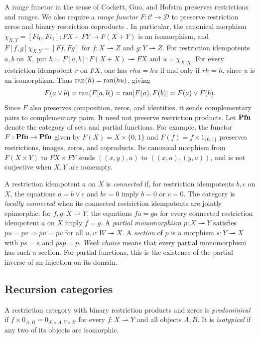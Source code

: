 A range functor in the sense of Cockett, Guo, and Hofstra
\cite[p.~424]{CGHRangeI} preserves restrictions and ranges.
We also require a \emph{range functor}
$F:\mathcal C\to\mathcal D$ to preserve
restriction zeros and binary restriction coproducts \cite[p.~7]{Lengyel2006}.
In particular, the canonical morphism
$\chi_{X,Y}=[F i_0,F i_1]:FX+FY\to F(X+Y)$
is an isomorphism, and
$F[f,g]\chi_{X,Y}=[Ff,Fg]$ for $f:X\rightharpoonup Z$ and
$g:Y\rightharpoonup Z$. For restriction idempotents $a,b$ on $X$, put
$h=F[a,b]:F(X+X)\rightharpoonup FX$ and $u=\chi_{X,X}$.
For every restriction idempotent $r$ on $FX$, one has
$rhu=hu$ if and only if $rh=h$, since $u$ is an isomorphism.
Thus $\operatorname{ran}(h)=\operatorname{ran}(hu)$, giving
\[
 F(a\vee b)=\operatorname{ran}(F[a,b])=\operatorname{ran}[F(a),F(b)]=F(a)\vee F(b).
\]
Since $F$ also preserves composition, zeros, and identities, it sends
complementary pairs to complementary pairs.
It need not preserve restriction products. Let $\mathbf{Pfn}$ denote the
category of sets and partial functions. For example, the functor
$F:\mathbf{Pfn}\to\mathbf{Pfn}$ given by $F(X)=X\times\{0,1\}$ and
$F(f)=f\times1_{\{0,1\}}$ preserves restrictions, images, zeros,
and coproducts. Its canonical morphism from $F(X\times Y)$ to
$FX\times FY$ sends $((x,y),a)$ to $((x,a),(y,a))$, and is
not surjective when $X,Y$ are nonempty.

A restriction idempotent $a$ on $X$ is \emph{connected} if, for
restriction idempotents $b,c$ on $X$, the equations $a=b\vee c$ and
$bc=0$ imply $b=0$ or $c=0$. The category is \emph{locally connected}
when its connected restriction idempotents are jointly epimorphic: for
$f,g:X\rightharpoonup Y$, the equations $fa=ga$ for every connected
restriction idempotent $a$ on $X$ imply $f=g$.
A \emph{partial monomorphism} $p:X\rightharpoonup Y$ satisfies
$pu=pv\Rightarrow\bar p u=\bar p v$ for all
$u,v:W\rightharpoonup X$.
A \emph{section} of $p$ is a morphism $s:Y\rightharpoonup X$
with $ps=\bar s$ and $psp=p$.
\emph{Weak choice} means that every partial monomorphism has such
a section. For partial functions, this is the existence of the
partial inverse of an injection on its domain.

\subsection{Recursion categories}

A restriction category with binary restriction products and zeros is
\emph{prodominical} if $f\times0_{A,B}=0_{X\times A,Y\times B}$ for
every $f:X\rightharpoonup Y$ and all objects $A,B$. It is \emph{isotypical} if any
two of its objects are isomorphic.

